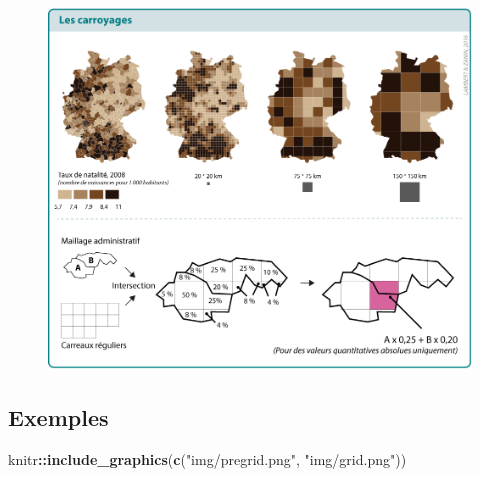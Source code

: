\documentclass[]{book}
\newenvironment{Shaded}{\begin{snugshade}}{\end{snugshade}}
\newcommand{\KeywordTok}[1]{\textcolor[rgb]{0.13,0.29,0.53}{\textbf{#1}}}
\newcommand{\StringTok}[1]{\textcolor[rgb]{0.31,0.60,0.02}{#1}}
\newcommand{\OperatorTok}[1]{\textcolor[rgb]{0.81,0.36,0.00}{\textbf{#1}}}
\newcommand{\NormalTok}[1]{#1}
\begin{document}
\begin{figure}
\centering
\includegraphics{img/caromet.png}
\caption{}
\end{figure}

\subsection{Exemples}\label{exemples}

\begin{Shaded}
\begin{Highlighting}[]
\NormalTok{knitr}\OperatorTok{::}\KeywordTok{include_graphics}\NormalTok{(}\KeywordTok{c}\NormalTok{(}\StringTok{"img/pregrid.png"}\NormalTok{, }\StringTok{"img/grid.png"}\NormalTok{))}
\end{Highlighting}
\end{Shaded}
\end{document}
